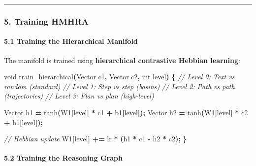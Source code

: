 \documentclass[
  11pt,
  a4paper,
]{article}
\newenvironment{Shaded}{\begin{snugshade}}{\end{snugshade}}
\newcommand{\CommentTok}[1]{\textcolor[rgb]{0.56,0.35,0.01}{\textit{#1}}}
\newcommand{\DataTypeTok}[1]{\textcolor[rgb]{0.13,0.29,0.53}{#1}}
\newcommand{\NormalTok}[1]{#1}
\newcommand{\OperatorTok}[1]{\textcolor[rgb]{0.81,0.36,0.00}{\textbf{#1}}}
\begin{document}
\begin{center}\rule{0.5\linewidth}{0.5pt}\end{center}

\subsubsection{5. Training HMHRA}\label{training-hmhra}

\paragraph{5.1 Training the Hierarchical
Manifold}\label{training-the-hierarchical-manifold}

The manifold is trained using \textbf{hierarchical contrastive Hebbian
learning}:

\begin{Shaded}
\begin{Highlighting}[]
\DataTypeTok{void}\NormalTok{ train\_hierarchical}\OperatorTok{(}\NormalTok{Vector c1}\OperatorTok{,}\NormalTok{ Vector c2}\OperatorTok{,} \DataTypeTok{int}\NormalTok{ level}\OperatorTok{)} \OperatorTok{\{}
    \CommentTok{// Level 0: Text vs random (standard)}
    \CommentTok{// Level 1: Step vs step (basins)}
    \CommentTok{// Level 2: Path vs path (trajectories)}
    \CommentTok{// Level 3: Plan vs plan (high{-}level)}
    
\NormalTok{    Vector h1 }\OperatorTok{=}\NormalTok{ tanh}\OperatorTok{(}\NormalTok{W1}\OperatorTok{[}\NormalTok{level}\OperatorTok{]} \OperatorTok{*}\NormalTok{ c1 }\OperatorTok{+}\NormalTok{ b1}\OperatorTok{[}\NormalTok{level}\OperatorTok{]);}
\NormalTok{    Vector h2 }\OperatorTok{=}\NormalTok{ tanh}\OperatorTok{(}\NormalTok{W1}\OperatorTok{[}\NormalTok{level}\OperatorTok{]} \OperatorTok{*}\NormalTok{ c2 }\OperatorTok{+}\NormalTok{ b1}\OperatorTok{[}\NormalTok{level}\OperatorTok{]);}
    
    \CommentTok{// Hebbian update}
\NormalTok{    W1}\OperatorTok{[}\NormalTok{level}\OperatorTok{]} \OperatorTok{+=}\NormalTok{ lr }\OperatorTok{*} \OperatorTok{(}\NormalTok{h1 }\OperatorTok{*}\NormalTok{ c1 }\OperatorTok{{-}}\NormalTok{ h2 }\OperatorTok{*}\NormalTok{ c2}\OperatorTok{);}
\OperatorTok{\}}
\end{Highlighting}
\end{Shaded}

\paragraph{5.2 Training the Reasoning
Graph}\label{training-the-reasoning-graph}
\end{document}
